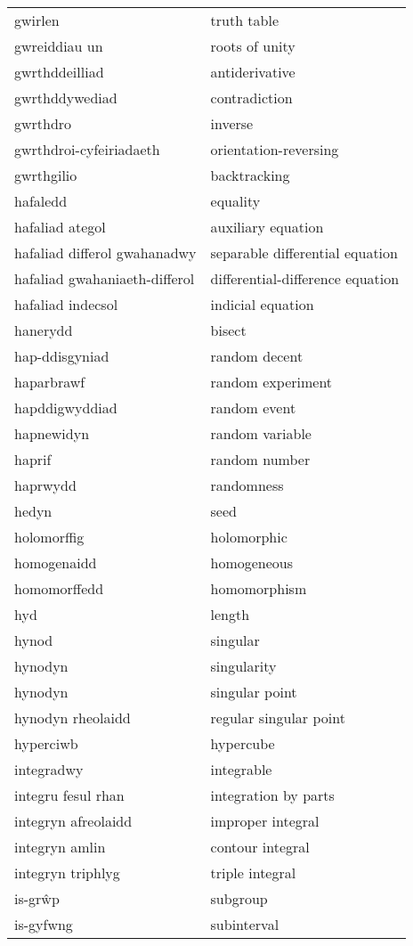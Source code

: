 \begin{supertabular}{p{0.22\textwidth}p{0.22\textwidth}}
gwirlen & truth table \\
gwreiddiau un & roots of unity \\
gwrthddeilliad & antiderivative \\
gwrthddywediad & contradiction \\
gwrthdro & inverse \\
gwrthdroi-cyfeiriadaeth & orientation-reversing \\
gwrthgilio & backtracking \\
hafaledd & equality \\
hafaliad ategol & auxiliary equation \\
hafaliad differol gwahanadwy & separable differential equation \\
hafaliad gwahaniaeth-differol & differential-difference equation \\
hafaliad indecsol & indicial equation \\
hanerydd & bisect \\
hap-ddisgyniad & random decent \\
haparbrawf & random experiment \\
hapddigwyddiad & random event \\
hapnewidyn & random variable \\
haprif & random number \\
haprwydd & randomness \\
hedyn & seed \\
holomorffig & holomorphic \\
homogenaidd & homogeneous \\
homomorffedd & homomorphism \\
hyd & length \\
hynod & singular \\
hynodyn & singularity \\
hynodyn & singular point \\
hynodyn rheolaidd & regular singular point \\
hyperciwb & hypercube \\
integradwy & integrable \\
integru fesul rhan & integration by parts \\
integryn afreolaidd & improper integral \\
integryn amlin & contour integral \\
integryn triphlyg & triple integral \\
is-grŵp & subgroup \\
is-gyfwng & subinterval \\

\end{supertabular}

